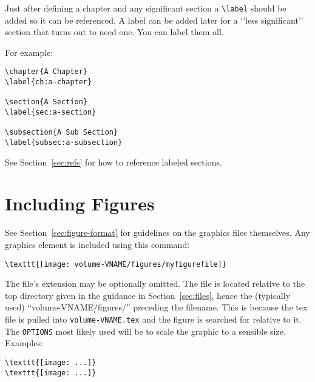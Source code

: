Just after defining a chapter and any significant section a
\verb|\label| should be added so it can be referenced.
A label can be added later for a `'less significant'' section that
turns out to need one. You can label them all. 

For example:

\begin{verbatim}
\chapter{A Chapter}
\label{ch:a-chapter}

\section{A Section}
\label{sec:a-section}

\subsection{A Sub Section}
\label{subsec:a-subsection}
\end{verbatim}

See Section~\ref{sec:refs} for how to reference labeled sections.

\section{Including Figures}
\label{sec:figures}

See Section~\ref{sec:figure-format} for guidelines on the graphics files themselves.
Any graphics element is included using this command:

\begin{verbatim}
\texttt{[image: volume-VNAME/figures/myfigurefile]}
\end{verbatim}

The file's extension may be optionally omitted.
The file is located relative to the top directory given in the guidance in Section~\ref{sec:files}, hence the (typically used) ``volume-VNAME/figures/'' preceding the filename.  This is because the tex file is pulled into \texttt{volume-VNAME.tex} and the figure is searched for relative to it.
The \texttt{OPTIONS} most likely used will be to scale the graphic to
a sensible size.  Examples:

\begin{verbatim}
\texttt{[image: ...]}
\texttt{[image: ...]}
\end{verbatim}

